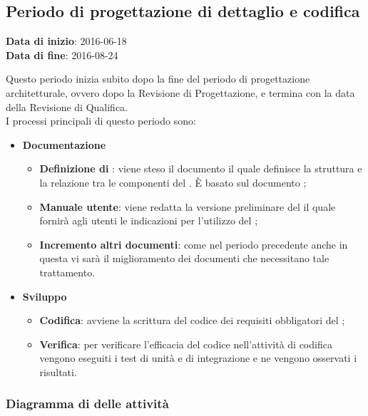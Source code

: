 		
		
	\subsection{Periodo di progettazione di dettaglio e codifica}
	\begin{center}
		\textbf{Data di inizio}: 2016-06-18 \\
		\textbf{Data di fine}: 2016-08-24 \\
	\end{center}
	Questo periodo inizia subito dopo la fine del periodo di progettazione architetturale, ovvero dopo la Revisione di Progettazione, e termina con la data della Revisione di Qualifica. \\
	I processi principali di questo periodo sono: 
		\begin{itemize}
			\item \textbf{Documentazione} 
			\att
			\begin{itemize} 
				\item \textbf{Definizione di }: viene steso il documento \DPdocRQ{} il quale definisce la struttura e la relazione tra le componenti del . È basato sul documento \STdocRQ;
				\item \textbf{Manuale utente}: viene redatta la versione preliminare del \MUdocRQ{} il quale fornirà agli utenti le indicazioni per l'utilizzo del ;
				\item \textbf{Incremento altri documenti}: come nel periodo precedente anche in questa vi sarà il miglioramento dei documenti che necessitano tale trattamento.
			\end{itemize}
			\item \textbf{Sviluppo}
			\att
			\begin{itemize}
				\item \textbf{Codifica}: avviene la scrittura del codice dei requisiti obbligatori del ;
				\item \textbf{Verifica}: per verificare l'efficacia del codice  nell'attività di codifica vengono eseguiti i test di unità e di integrazione e ne vengono osservati i risultati. 
			\end{itemize}
		\end{itemize}
		\subsubsection{Diagramma di  delle attività}
		
